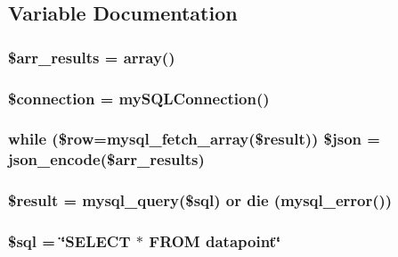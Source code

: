 \subsection{Variable Documentation}
\hypertarget{getdatapoint_8php_a0774b147e1e9ba3e6ba73b927a2ef77e}{
\subsubsection[{\$arr\-\_\-results}]{\setlength{\rightskip}{0pt plus 5cm}\$arr\-\_\-results = array()}}\label{getdatapoint_8php_a0774b147e1e9ba3e6ba73b927a2ef77e}
\hypertarget{getdatapoint_8php_a0d9c79b9b86b3f5891c6d3892f12c6a0}{
\subsubsection[{\$connection}]{\setlength{\rightskip}{0pt plus 5cm}\$connection = my\-S\-Q\-L\-Connection()}}\label{getdatapoint_8php_a0d9c79b9b86b3f5891c6d3892f12c6a0}
\hypertarget{getdatapoint_8php_a0f6ba5ad8be49dce0e92b58a3a8c4de7}{
\subsubsection[{\$json}]{\setlength{\rightskip}{0pt plus 5cm}while (\$row=mysql\-\_\-fetch\-\_\-array(\$result)) \$json = json\-\_\-encode(\$arr\-\_\-results)}}\label{getdatapoint_8php_a0f6ba5ad8be49dce0e92b58a3a8c4de7}
\hypertarget{getdatapoint_8php_a112ef069ddc0454086e3d1e6d8d55d07}{
\subsubsection[{\$result}]{\setlength{\rightskip}{0pt plus 5cm}\$result = mysql\-\_\-query(\$sql) or die (mysql\-\_\-error())}}\label{getdatapoint_8php_a112ef069ddc0454086e3d1e6d8d55d07}
\hypertarget{getdatapoint_8php_a047170d6020a882807665812a27e2525}{
\subsubsection[{\$sql}]{\setlength{\rightskip}{0pt plus 5cm}\$sql = \char`\"{}S\-E\-L\-E\-C\-T $\ast$ F\-R\-O\-M datapoint\char`\"{}}}\label{getdatapoint_8php_a047170d6020a882807665812a27e2525}
